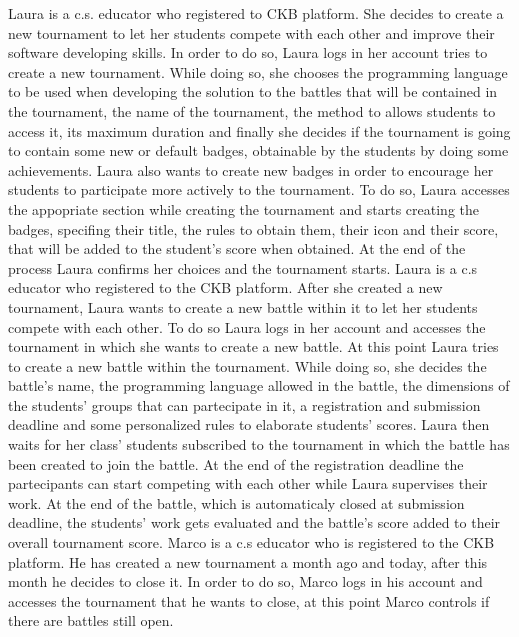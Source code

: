 \documentclass{article}
\newcounter{subsubsubsection}[subsubsection]
\begin{document}
{
Laura is a c.s. educator who registered to CKB platform. She decides to create a new tournament to let her students compete with each other and improve their software developing skills. 
In order to do so, Laura logs in her account tries to create a new tournament. 
While doing so, she chooses the programming language to be used when developing the solution to the battles that will be contained in the tournament, 
the name of the tournament, the method to allows students to access it, its maximum duration and finally she decides if the tournament is going to contain some new or default badges,
 obtainable by the students by doing some achievements.
Laura also wants to create new badges in order to encourage her students to participate more actively to the tournament. 
To do so, Laura accesses the appopriate section while creating the tournament and starts creating the badges, specifing their title, the rules to obtain them, their icon and their score, 
that will be added to the student's score when obtained.
At the end of the process Laura confirms her choices and the tournament starts.
Laura is a c.s educator who registered to the CKB platform. After she created a new tournament, Laura wants to create a new battle within it to let her students compete with each other. 
To do so Laura logs in her account and accesses the tournament in which she wants to create a new battle. 
At this point Laura tries to create a new battle within the tournament. 
While doing so, she decides the battle's name, the programming language allowed in the battle, the dimensions of the students' groups that can partecipate in it, 
a registration and submission deadline and some personalized rules to elaborate students' scores.
Laura then waits for her class' students subscribed to the tournament in which the battle has been created to join the battle. 
At the end of the registration deadline the partecipants can start competing with each other while Laura supervises their work.
At the end of the battle, which is automaticaly closed at submission deadline, the students' work gets evaluated and the battle's score added to their overall tournament score.
Marco is a c.s educator who is registered to the CKB platform. He has created a new tournament a month ago and today, after this month he decides to close it. 
In order to do so, Marco logs in his account and accesses the tournament that he wants to close, at this point Marco controls if there are battles still open. 
}
\end{document}
